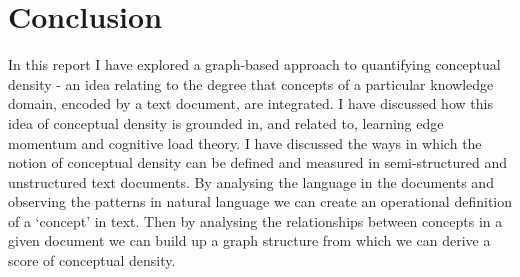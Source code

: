 \documentclass[12pt]{article}
\theoremstyle{grammarstyle}
\begin{document}
\section{Conclusion} \label{sec:conclusion}
In this report I have explored a graph-based approach to quantifying conceptual density - an idea relating to the degree that concepts of a particular knowledge domain, encoded by a text document, are integrated. I have discussed how this idea of conceptual density is grounded in, and related to, learning edge momentum and cognitive load theory. I have discussed the ways in which the notion of conceptual density can be defined and measured in semi-structured and unstructured text documents. By analysing the language in the documents and observing the patterns in natural language we can create an operational definition of a `concept' in text. Then by analysing the relationships between concepts in a given document we can build up a graph structure from which we can derive a score of conceptual density. 


% 





    

\end{document}
